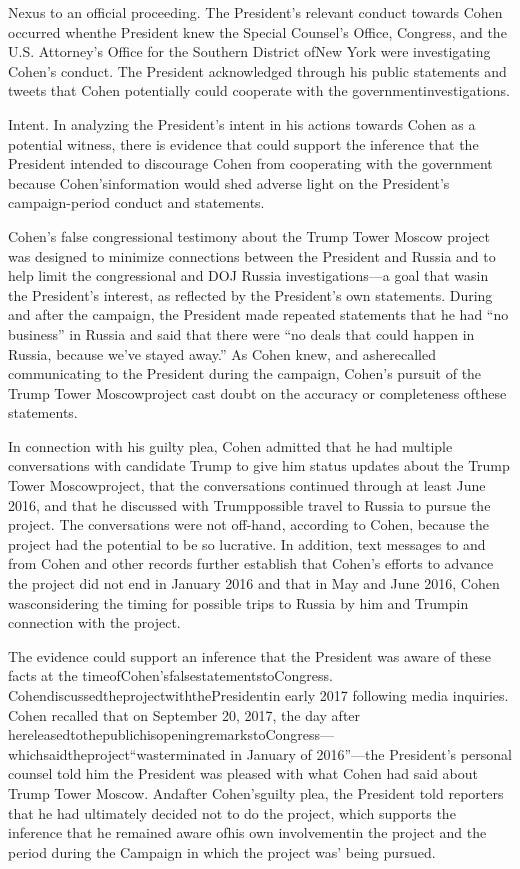 {Nexus to an official proceeding. The President’s relevant conduct towards Cohen occurred whenthe President knew the Special Counsel’s Office, Congress, and the U.S. Attorney’s Office for the Southern District ofNew York were investigating Cohen’s conduct. The President acknowledged through his public statements and tweets that Cohen potentially could cooperate with the governmentinvestigations.

Intent. In analyzing the President’s intent in his actions towards Cohen as a potential witness, there is evidence that could support the inference that the President intended to discourage Cohen from cooperating with the government because Cohen’sinformation would shed adverse light on the President’s campaign-period conduct and statements.

Cohen’s false congressional testimony about the Trump Tower Moscow project was designed to minimize connections between the President and Russia and to help limit the congressional and DOJ Russia investigations—a goal that wasin the President’s interest, as reflected by the President’s own statements. During and after the campaign, the President made repeated statements that he had “no business” in Russia and said that there were “no deals that could happen in Russia, because we’ve stayed away.” As Cohen knew, and asherecalled communicating to the President during the campaign, Cohen’s pursuit of the Trump Tower Moscowproject cast doubt on the accuracy or completeness ofthese statements.

In connection with his guilty plea, Cohen admitted that he had multiple conversations with candidate Trump to give him status updates about the Trump Tower Moscowproject, that the conversations continued through at least June 2016, and that he discussed with Trumppossible travel to Russia to pursue the project. The conversations were not off-hand, according to Cohen, because the project had the potential to be so lucrative. In addition, text messages to and from Cohen and other records further establish that Cohen’s efforts to advance the project did not end in January 2016 and that in May and June 2016, Cohen wasconsidering the timing for possible trips to Russia by him and Trumpin connection with the project.

The evidence could support an inference that the President was aware of these facts at the timeofCohen’sfalsestatementstoCongress. CohendiscussedtheprojectwiththePresidentin early 2017 following media inquiries. Cohen recalled that on September 20, 2017, the day after hereleasedtothepublichisopeningremarkstoCongress—whichsaidtheproject“wasterminated in January of 2016”—the President’s personal counsel told him the President was pleased with what Cohen had said about Trump Tower Moscow. Andafter Cohen’sguilty plea, the President told reporters that he had ultimately decided not to do the project, which supports the inference that he remained aware ofhis own involvementin the project and the period during the Campaign in which the project was’ being pursued.

}

